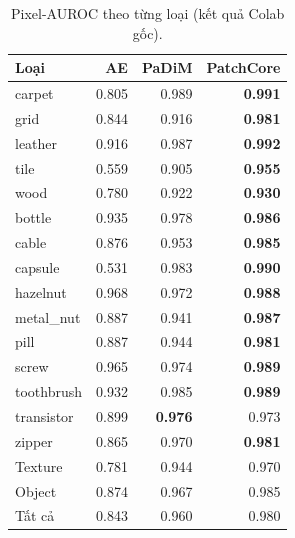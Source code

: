 \begin{table}[htbp]\centering
\caption{Pixel-AUROC theo từng loại (kết quả Colab gốc).}
\begin{tabular}{@{}lrrr@{}}\toprule Loại & AE & PaDiM & PatchCore \\ \midrule
carpet & 0.805 & 0.989 & \textbf{0.991} \\
grid & 0.844 & 0.916 & \textbf{0.981} \\
leather & 0.916 & 0.987 & \textbf{0.992} \\
tile & 0.559 & 0.905 & \textbf{0.955} \\
wood & 0.780 & 0.922 & \textbf{0.930} \\
bottle & 0.935 & 0.978 & \textbf{0.986} \\
cable & 0.876 & 0.953 & \textbf{0.985} \\
capsule & 0.531 & 0.983 & \textbf{0.990} \\
hazelnut & 0.968 & 0.972 & \textbf{0.988} \\
metal\_nut & 0.887 & 0.941 & \textbf{0.987} \\
pill & 0.887 & 0.944 & \textbf{0.981} \\
screw & 0.965 & 0.974 & \textbf{0.989} \\
toothbrush & 0.932 & 0.985 & \textbf{0.989} \\
transistor & 0.899 & \textbf{0.976} & 0.973 \\
zipper & 0.865 & 0.970 & \textbf{0.981} \\
\midrule Texture & 0.781 & 0.944 & 0.970 \\
Object & 0.874 & 0.967 & 0.985 \\
Tất cả & 0.843 & 0.960 & 0.980 \\
\bottomrule\end{tabular}\end{table}
